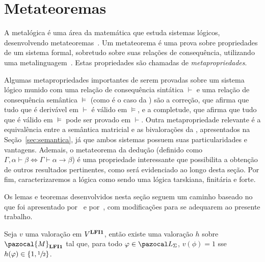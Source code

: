 \section{Metateoremas}\label{sec:metateoremas}
    A metalógica é uma área da matemática que estuda sistemas lógicos, desenvolvendo metateoremas~\cite{Jacquette2002-JACACT-7}. Um metateorema é uma prova sobre propriedades de um sistema formal, sobretudo sobre suas relações de consequência, utilizando uma metalinguagem~\cite{Tarski1956-TARLSM, Rasiowa1963-RASTMO, Barile_2024}. Estas propriedades são chamadas de \textit{metapropriedades}. 
    
    Algumas metapropriedades importantes de serem provadas sobre um sistema lógico munido com uma relação de consequência sintática $\vdash$ e uma relação de consequência semântica $\vDash$ (como é o caso da \lfium{}) são a correção, que afirma que tudo que é derivável em $\vdash$ é válido em $\vDash$, e a completude, que afirma que tudo que é válido em $\vDash$ pode ser provado em $\vdash$. Outra metapropriedade relevante é a equivalência entre a semântica matricial e as bivalorações da \lfium{}, apresentados na Seção~\ref{sec:semantica}, já que ambos sistemas possuem suas particularidades e vantagens. Ademais, o metateorema da dedução (definido como $\Gamma, \alpha \vdash \beta \Longleftrightarrow \Gamma \vdash \alpha \to \beta$) é uma propriedade interessante que possibilita a obtenção de outros resultados pertinentes, como será evidenciado ao longo desta seção. Por fim, caracterizaremos a lógica \lfium{} como sendo uma lógica tarskiana, finitária e \lfi{} forte.
    
    Os lemas e teoremas desenvolvidos nesta seção seguem um caminho baseado no que foi apresentado por~ e por~, com modificações para se adequarem ao presente trabalho.


    \begin{lema}\label{lem:matval}
        Seja $v$ uma valoração em $V^{{\normalfont\textbf{LFI1}}}$, então existe uma valoração $h$ sobre $\pazocal{M}_{\lfium}$ tal que, para todo $\phi \in \ling{}$, $v(\phi) = 1$ sse $h(\varphi) \in \{1, \sfrac{1}{2}{}\}$.
    \end{lema}

